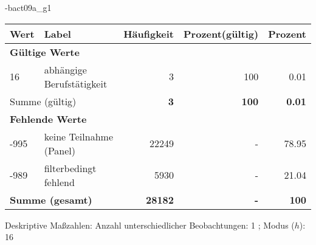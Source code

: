                 \vspace*{-\baselineskip}
					\begin{filecontents}{\jobname-bact09a_g1}
					\begin{longtable}{lXrrr}
					\toprule
					\textbf{Wert} & \textbf{Label} & \textbf{Häufigkeit} & \textbf{Prozent(gültig)} & \textbf{Prozent} \\
					\endhead
					\midrule
					\multicolumn{5}{l}{\textbf{Gültige Werte}}\\

					16 &
					\multicolumn{1}{X}{ abhängige Berufstätigkeit   } &


					  \num{3} &
					  \num[round-mode=places,round-precision=2]{100} &
					    \num[round-mode=places,round-precision=2]{0.01} \\
					\midrule
					\multicolumn{2}{l}{Summe (gültig)} &
					  \textbf{\num{3}} &
					\textbf{100} &
					  \textbf{\num[round-mode=places,round-precision=2]{0.01}} \\
					\multicolumn{5}{l}{\textbf{Fehlende Werte}}\\
							-995 &
							keine Teilnahme (Panel) &
							  \num{22249} &
							 - &
							  \num[round-mode=places,round-precision=2]{78.95} \\
							-989 &
							filterbedingt fehlend &
							  \num{5930} &
							 - &
							  \num[round-mode=places,round-precision=2]{21.04} \\
					\midrule
					\multicolumn{2}{l}{\textbf{Summe (gesamt)}} &
				      \textbf{\num{28182}} &
				    \textbf{-} &
				    \textbf{100} \\
					\bottomrule
					\end{longtable}
					\end{filecontents}
				\label{tableValues:bact09a_g1}
				\vspace*{-\baselineskip}
                    \begin{noten}
                	    \note{} Deskriptive Maßzahlen:
                	    Anzahl unterschiedlicher Beobachtungen: 1%
                	    ; 
                	      Modus ($h$): 16
                     \end{noten}


